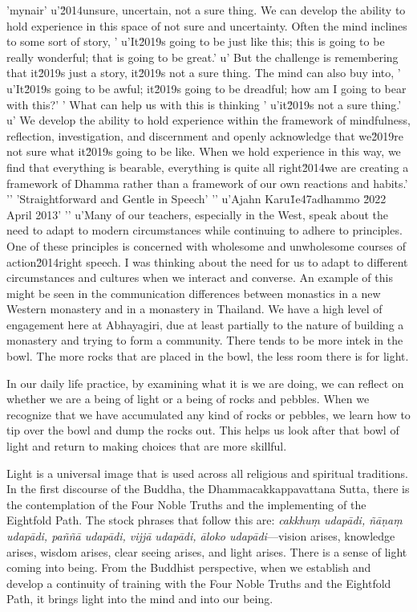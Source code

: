 'mynair'
u'\u2014unsure, uncertain, not a sure thing. We can develop the ability to hold experience in this space of not sure and uncertainty. Often the mind inclines to some sort of story, '
u'It\u2019s going to be just like this; this is going to be really wonderful; that is going to be great.'
u' But the challenge is remembering that it\u2019s just a story, it\u2019s not a sure thing. The mind can also buy into, '
u'It\u2019s going to be awful; it\u2019s going to be dreadful; how am I going to bear with this?'
' What can help us with this is thinking '
u'it\u2019s not a sure thing.'
u' We develop the ability to hold experience within the framework of mindfulness, reflection, investigation, and discernment and openly acknowledge that we\u2019re not sure what it\u2019s going to be like. When we hold experience in this way, we find that everything is bearable, everything is quite all right\u2014we are creating a framework of Dhamma rather than a framework of our own reactions and habits.'
'\n'
'Straightforward and Gentle in Speech'
'\n'
u'Ajahn Karu\u1e47adhammo \u2022 April 2013'
'\n'
u'Many of our teachers, especially in the West, speak about the need to adapt to modern circumstances while continuing to adhere to principles. One of these principles is concerned with wholesome and unwholesome courses of action\u2014right speech. I was thinking about the need for us to adapt to different circumstances and cultures when we interact and converse. An example of this might be seen in the communication differences between monastics in a new Western monastery and in a monastery in Thailand. We have a high level of engagement here at Abhayagiri, due at least partially to the nature of building a monastery and trying to form a community. There tends to be more intek in the bowl. The more rocks that 
are placed in the bowl, the less room there is for light.

In our daily life practice, by examining what it is we are doing, we 
can reflect on whether we are a being of light or a being of rocks and 
pebbles. When we recognize that we have accumulated any kind of rocks 
or pebbles, we learn how to tip over the bowl and dump the rocks out. 
This helps us look after that bowl of light and return to making 
choices that are more skillful.

Light is a universal image that is used across all religious and 
spiritual traditions. In the first discourse of the Buddha, the 
Dhammacakkappavattana Sutta, there is the contemplation of the Four 
Noble Truths and the implementing of the Eightfold Path. The stock 
phrases that follow this are: \emph{cakkhuṃ udapādi, ñāṇaṃ 
udapādi, paññā udapādi, vijjā udapādi, āloko udapādi}---vision 
arises, knowledge arises, wisdom arises, clear seeing arises, and light 
arises. There is a sense of light coming into being. From the Buddhist 
perspective, when we establish and develop a continuity of training 
with the Four Noble Truths and the Eightfold Path, it brings light into 
the mind and into our being.

